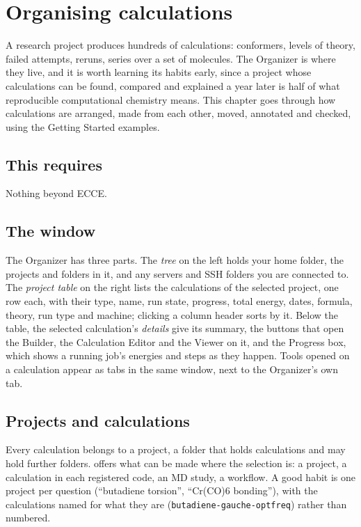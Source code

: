 \chapter{Organising calculations}
\label{ch:organizer}

A research project produces hundreds of calculations: conformers, levels of theory, failed attempts, reruns, series over a set of molecules. The Organizer is where they live, and it is worth learning its habits early, since a project whose calculations can be found, compared and explained a year later is half of what reproducible computational chemistry means. This chapter goes through how calculations are arranged, made from each other, moved, annotated and checked, using the Getting Started examples.

\section*{This requires}
Nothing beyond ECCE.

\section{The window}
The Organizer has three parts. The \emph{tree} on the left holds your home folder, the projects and folders in it, and any servers and SSH folders you are connected to. The \emph{project table} on the right lists the calculations of the selected project, one row each, with their type, name, run state, progress, total energy, dates, formula, theory, run type and machine; clicking a column header sorts by it. Below the table, the selected calculation's \emph{details} give its summary, the buttons that open the Builder, the Calculation Editor and the Viewer on it, and the Progress box, which shows a running job's energies and steps as they happen. Tools opened on a calculation appear as tabs in the same window, next to the Organizer's own tab.

\section{Projects and calculations}
Every calculation belongs to a project, a folder that holds calculations and may hold further folders.  offers what can be made where the selection is: a project, a calculation in each registered code, an MD study, a workflow. A good habit is one project per question (``butadiene torsion'', ``Cr(CO)6 bonding''), with the calculations named for what they are (\texttt{butadiene-gauche-optfreq}) rather than numbered.

